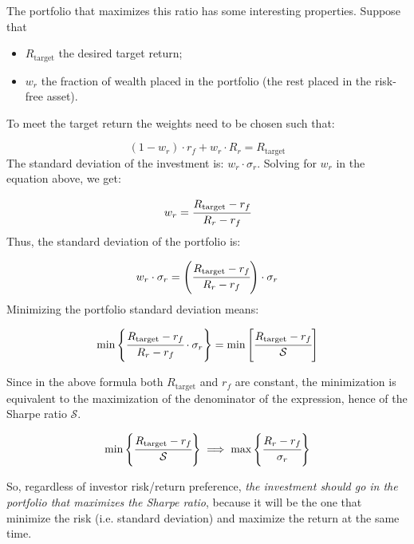 The portfolio that maximizes this ratio has some interesting properties. Suppose that

\begin{itemize}
\tightlist
\item
  $R_\textrm{target}$ the desired target return;
\item
  $w_r$ the fraction of wealth placed in the portfolio (the rest placed in the risk-free asset).
\end{itemize}
\noindent
To meet the target return the weights need to be chosen such that:

\begin{equation*}
(1 - w_r)\cdot r_f + w_r\cdot R_r = R_\textrm{target}
\end{equation*}
\noindent
The standard deviation of the investment is: $w_r\cdot \sigma_r$. Solving for $w_r$ in the equation above, we get:

\begin{equation*}
	w_r = \cfrac{R_\textrm{target} - r_f}{R_r - r_f}
\end{equation*}
Thus, the standard deviation of the portfolio is:

\begin{equation*}
w_r\cdot \sigma_r = \left(\cfrac{R_\textrm{target} - r_f}{R_r - r_f}\right)\cdot \sigma_r
\end{equation*}
Minimizing the portfolio standard deviation means:

\begin{equation}
\textrm{min}\left\{\cfrac{R_\textrm{target} - r_f}{R_r - r_f}\cdot \sigma_r\right\} = \textrm{min}\left[\cfrac{R_\textrm{target} - r_f}{\mathcal{S}}\right]
\end{equation}

Since in the above formula both $R_{\textrm{target}}$ and $r_f$ are constant, the minimization is equivalent to the maximization of the denominator of the expression, hence of the Sharpe ratio $\mathcal{S}$.

\begin{equation}
\textrm{min}\left\{\cfrac{R_\textrm{target} - r_f}{\mathcal{S}}\right\}
\implies\textrm{max}\left\{\cfrac{R_r - r_f}{\sigma_r}\right\}
\end{equation}

So, regardless of investor risk/return preference, \emph{the investment should go in the portfolio that maximizes the Sharpe ratio}, because it will be the one that minimize the risk (i.e. standard deviation) and maximize the return at the same time.

